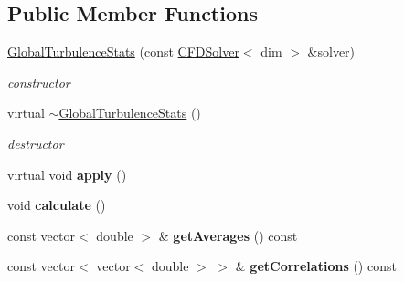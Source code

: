 \subsection*{Public Member Functions}
\begin{DoxyCompactItemize}
\item 
\hypertarget{classnatrium_1_1GlobalTurbulenceStats_ac73a107d5d949a70e912051135514a72}{
\hyperlink{classnatrium_1_1GlobalTurbulenceStats_ac73a107d5d949a70e912051135514a72}{GlobalTurbulenceStats} (const \hyperlink{classnatrium_1_1CFDSolver}{CFDSolver}$<$ dim $>$ \&solver)}
\label{classnatrium_1_1GlobalTurbulenceStats_ac73a107d5d949a70e912051135514a72}

\begin{DoxyCompactList}\small\item\em constructor \item\end{DoxyCompactList}\item 
\hypertarget{classnatrium_1_1GlobalTurbulenceStats_acbd5928c1e3973d6e5bd042785c1210d}{
virtual \hyperlink{classnatrium_1_1GlobalTurbulenceStats_acbd5928c1e3973d6e5bd042785c1210d}{$\sim$GlobalTurbulenceStats} ()}
\label{classnatrium_1_1GlobalTurbulenceStats_acbd5928c1e3973d6e5bd042785c1210d}

\begin{DoxyCompactList}\small\item\em destructor \item\end{DoxyCompactList}\item 
\hypertarget{classnatrium_1_1GlobalTurbulenceStats_affafdf2db4bdc079db7f8b5c427c55d9}{
virtual void {\bfseries apply} ()}
\label{classnatrium_1_1GlobalTurbulenceStats_affafdf2db4bdc079db7f8b5c427c55d9}

\item 
\hypertarget{classnatrium_1_1GlobalTurbulenceStats_ade8230aad41c053d7e6796d7a55f76c0}{
void {\bfseries calculate} ()}
\label{classnatrium_1_1GlobalTurbulenceStats_ade8230aad41c053d7e6796d7a55f76c0}

\item 
\hypertarget{classnatrium_1_1GlobalTurbulenceStats_a6e76e3705fbd5f36a6e4d7cae35a36b9}{
const vector$<$ double $>$ \& {\bfseries getAverages} () const }
\label{classnatrium_1_1GlobalTurbulenceStats_a6e76e3705fbd5f36a6e4d7cae35a36b9}

\item 
\hypertarget{classnatrium_1_1GlobalTurbulenceStats_accd454e0c8dac1429b9ddc16d504cd89}{
const vector$<$ vector$<$ double $>$ $>$ \& {\bfseries getCorrelations} () const }
\label{classnatrium_1_1GlobalTurbulenceStats_accd454e0c8dac1429b9ddc16d504cd89}


\end{DoxyCompactItemize}
